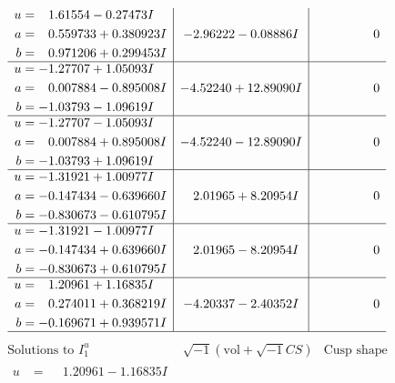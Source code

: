 \documentclass[1p]{elsarticle_modified}
\theoremstyle{definition}
\newcommand{\I}{\sqrt{-1}}
\begin{document}
$$\begin{array}{c|c|c}
\begin{aligned}
u &= \phantom{-}1.61554 - 0.27473 I \\
a &= \phantom{-}0.559733 + 0.380923 I \\
b &= \phantom{-}0.971206 + 0.299453 I\end{aligned}
 & -2.96222 - 0.08886 I & \phantom{-0.000000 } 0 \\ \hline\begin{aligned}
u &= -1.27707 + 1.05093 I \\
a &= \phantom{-}0.007884 - 0.895008 I \\
b &= -1.03793 - 1.09619 I\end{aligned}
 & -4.52240 + 12.89090 I & \phantom{-0.000000 } 0 \\ \hline\begin{aligned}
u &= -1.27707 - 1.05093 I \\
a &= \phantom{-}0.007884 + 0.895008 I \\
b &= -1.03793 + 1.09619 I\end{aligned}
 & -4.52240 - 12.89090 I & \phantom{-0.000000 } 0 \\ \hline\begin{aligned}
u &= -1.31921 + 1.00977 I \\
a &= -0.147434 - 0.639660 I \\
b &= -0.830673 - 0.610795 I\end{aligned}
 & \phantom{-}2.01965 + 8.20954 I & \phantom{-0.000000 } 0 \\ \hline\begin{aligned}
u &= -1.31921 - 1.00977 I \\
a &= -0.147434 + 0.639660 I \\
b &= -0.830673 + 0.610795 I\end{aligned}
 & \phantom{-}2.01965 - 8.20954 I & \phantom{-0.000000 } 0 \\ \hline\begin{aligned}
u &= \phantom{-}1.20961 + 1.16835 I \\
a &= \phantom{-}0.274011 + 0.368219 I \\
b &= -0.169671 + 0.939571 I\end{aligned}
 & -4.20337 - 2.40352 I & \phantom{-0.000000 } 0\\
 \hline 
 \end{array}$$\newpage$$\begin{array}{c|c|c}  
\text{Solutions to }I^u_{1}& \I (\text{vol} + \sqrt{-1}CS) & \text{Cusp shape}\\
 \hline 
\begin{aligned}
u &= \phantom{-}1.20961 - 1.16835 I \\

\end{aligned}
\end{array}$$
\end{document}
